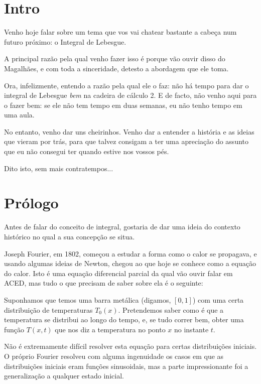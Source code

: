 \documentclass{article}
\title{}
\author{}
\begin{document}
\maketitle

\section{Intro}

Venho hoje falar sobre um tema que vos vai chatear bastante a cabeça num futuro próximo: o Integral de Lebesgue.

A principal razão pela qual venho fazer isso é porque vão ouvir disso do Magalhães, e com toda a sinceridade, detesto a abordagem que ele toma.

Ora, infelizmente, entendo a razão pela qual ele o faz: não há tempo para dar o integral de Lebesgue \emph{bem} na cadeira de cálculo 2. E de facto, não venho aqui para o fazer bem: se ele não tem tempo em duas semanas, eu não tenho tempo em uma aula.

No entanto, venho dar uns cheirinhos. Venho dar a entender a história e as ideias que vieram por trás, para que talvez consigam a ter uma apreciação do assunto que eu não consegui ter quando estive nos vossos pés.

Dito isto, sem mais contratempos...

\section{Prólogo}

Antes de falar do conceito de integral, gostaria de dar uma ideia do contexto histórico no qual a sua concepção se situa.

Joseph Fourier, em 1802, começou a estudar a forma como o calor se propagava, e usando algumas ideias de Newton, chegou ao que hoje se conhece como a equação do calor. Isto é uma equação diferencial parcial da qual vão ouvir falar em ACED, mas tudo o que precisam de saber sobre ela é o seguinte:

Suponhamos que temos uma barra metálica (digamos, $[0,1]$) com uma certa distribuição de temperaturas $T_0(x)$. Pretendemos saber como é que a temperatura se distribui ao longo do tempo, e, se tudo correr bem, obter uma função $T(x, t)$ que nos diz a temperatura no ponto $x$ no instante $t$.

Não é extremamente difícil resolver esta equação para certas distribuições iniciais. O próprio Fourier resolveu com alguma ingenuidade os casos em que as distribuições iniciais eram funções sinusoidais, mas a parte impressionante foi a generalização a qualquer estado inicial.
\end{document}
